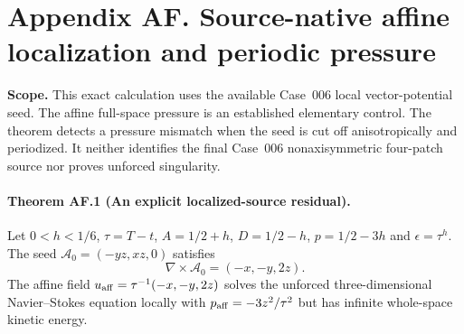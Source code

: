 \clearpage
\section*{Appendix AF. Source-native affine localization and periodic pressure}
\noindent\textbf{Scope.} This exact calculation uses the available Case~006 local vector-potential seed. The affine full-space pressure is an established elementary control. The theorem detects a pressure mismatch when the seed is cut off anisotropically and periodized. It neither identifies the final Case~006 nonaxisymmetric four-patch source nor proves unforced singularity.

\paragraph{Theorem AF.1 (An explicit localized-source residual).}
Let $0<h<1/6$, $\tau=T-t$, $A=1/2+h$, $D=1/2-h$, $p=1/2-3h$ and $\epsilon=\tau^h$. The seed $\mathcal A_0=(-yz,xz,0)$ satisfies
\[
 \nabla\times\mathcal A_0=(-x,-y,2z).
\]
The affine field $u_{\rm aff}=\tau^{-1}(-x,-y,2z)$ solves the unforced three-dimensional Navier--Stokes equation locally with $p_{\rm aff}=-3z^2/\tau^2$ but has infinite whole-space kinetic energy.

